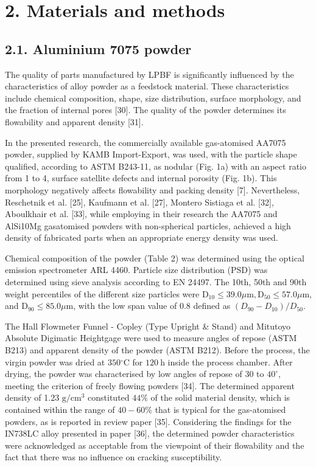 \documentclass[10pt]{article}
\begin{document}
\section*{2. Materials and methods}
\subsection*{2.1. Aluminium 7075 powder}
The quality of parts manufactured by LPBF is significantly influenced by the characteristics of alloy powder as a feedstock material. These characteristics include chemical composition, shape, size distribution, surface morphology, and the fraction of internal pores [30]. The quality of the powder determines its flowability and apparent density [31].

In the presented research, the commercially available gas-atomised AA7075 powder, supplied by KAMB Import-Export, was used, with the particle shape qualified, according to ASTM B243-11, as nodular (Fig. 1a) with an aspect ratio from 1 to 4, surface satellite defects and internal porosity (Fig. 1b). This morphology negatively affects flowability and packing density [7]. Nevertheless, Reschetnik et al. [25], Kaufmann et al. [27], Montero Sistiaga et al. [32], Aboulkhair et al. [33], while employing in their research the AA7075 and AlSi10Mg gasatomised powders with non-spherical particles, achieved a high density of fabricated parts when an appropriate energy density was used.

Chemical composition of the powder (Table 2) was determined using the optical emission spectrometer ARL 4460. Particle size distribution (PSD) was determined using sieve analysis according to EN 24497. The 10th, 50th and 90th weight percentiles of the different size particles were $\mathrm{D}_{10} \leq 39.0 \mu \mathrm{m}, \mathrm{D}_{50} \leq 57.0 \mu \mathrm{m}$, and $\mathrm{D}_{90} \leq 85.0 \mu \mathrm{m}$, with the low span value of 0.8 defined as $\left(D_{90}-D_{10}\right) / D_{50}$.

The Hall Flowmeter Funnel - Copley (Type Upright \& Stand) and Mitutoyo Absolute Digimatic Heightgage were used to measure angles of repose (ASTM B213) and apparent density of the powder (ASTM B212). Before the process, the virgin powder was dried at $350{ }^{\circ} \mathrm{C}$ for $120 \mathrm{~h}$ inside the process chamber. After drying, the powder was characterised by low angles of repose of 30 to $40^{\circ}$, meeting the criterion of freely flowing powders [34]. The determined apparent density of 1.23 $\mathrm{g} / \mathrm{cm}^{3}$ constituted $44 \%$ of the solid material density, which is contained within the range of $40-60 \%$ that is typical for the gas-atomised powders, as is reported in review paper [35]. Considering the findings for the IN738LC alloy presented in paper [36], the determined powder characteristics were acknowledged as acceptable from the viewpoint of their flowability and the fact that there was no influence on cracking susceptibility.
\end{document}
